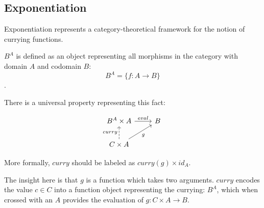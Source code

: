 \documentclass[]{article}
\begin{document}
\subsection{Exponentiation}

Exponentiation represents a category-theoretical framework for the notion of currying functions.

$B^A$ is defined as an object representing all morphisms in the category with domain $A$ and codomain $B$:
$$B^A = \{f: A \to B\}$$.

There is a universal property representing this fact:

$$\begin{tikzcd}
B^A \times A \arrow{r}{eval} & B \\
C \times A \arrow[dashed]{u}{curry} \arrow[swap]{ur}{g} &
\end{tikzcd}$$

More formally, $\mathit{curry}$ should be labeled as $\mathit{curry}(g) \times \mathit{id}_A$.

The insight here is that $g$ is a function which takes two arguments. $\mathit{curry}$ encodes the value $c \in C$ into
a function object representing the currying: $B^A$, which when crossed with an $A$ provides the evaluation of $g:
C\times A \to B$.
\end{document}
